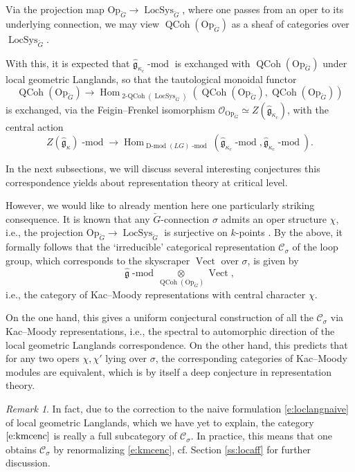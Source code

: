\documentclass[10pt]{amsart}
\newcommand{\fgk}{\widehat{\fg}_\kappa}
\newcommand{\Op}{\mathrm{Op}_{\cG}}
\newcommand{\gkc}{\gk_{\kappa_c}}
\newcommand{\TwoCoh}{\on{2-QCoh}}
\newcommand{\LS}{\on{LocSys}_{\cG}}
\newcommand{\fg}{\mathfrak{g}}
\newcommand{\on}{\operatorname}
\renewcommand{\mod}{\on{-mod}}
\newcommand{\Dmod}{\on{D-mod}}
\newcommand{\Vect}{\on{Vect}}
\theoremstyle{remark}
\newtheorem{re}[subsubsection]{Remark}
\newcommand{\Hom}{\operatorname{Hom}}
\newcommand{\OO}{\mathscr{O}}
\newcommand{\gk}{\widehat{\fg}}
\numberwithin{equation}{section}
\newcommand{\cG}{\check{G}}
\newcommand{\sC}{\mathscr{C}}
\renewcommand{\mod}{\operatorname{-mod}}
\newcommand{\QCoh}{\on{QCoh}}
\begin{document}
\subsubsection{} Via the projection map $\Op \rightarrow \LS$, where one 
passes from an oper 
to its underlying connection, we may view $\QCoh(\Op)$ as a sheaf of categories 
over $\LS$. 


With this, it is expected that $\gkc\mod$ is exchanged with 
$\QCoh(\Op)$ under local geometric Langlands, so that the tautological monoidal 
functor
%
\[
\QCoh(\Op) \rightarrow \Hom_{\TwoCoh(\LS)}(\QCoh(\Op), \QCoh(\Op)) 
\]
%
is exchanged, via the Feigin--Frenkel isomorphism $\OO_{\Op} \simeq Z(\gkc)$, 
with the central action 
%
\[
  Z(\fgk)\mod \rightarrow \Hom_{\Dmod(LG)\mod}(\gkc\mod, \gkc\mod).
  \]
%







 In the next subsections, we will 
discuss several interesting conjectures this correspondence yields about representation theory 
at critical level. 

However, we would like to already mention here one particularly striking consequence. 
It is known that any $\cG$-connection $\sigma$ admits an oper structure $\chi$, 
i.e., the projection $\Op \rightarrow \LS$ is surjective on $k$-points \cite{frenkelzhuoper}. By the 
above, it formally follows that the `irreducible' categorical representation 
$\sC_{\sigma}$ of the loop group, which corresponds to the skyscraper $\Vect$ 
over $\sigma$, is given by 
%
\begin{equation} \label{e:kmcenc}
  \gk\mod \underset{\QCoh(\Op)} \otimes \Vect,
\end{equation}
%
i.e., the category of Kac--Moody representations with central character $\chi$. 


On the one hand, this gives a uniform conjectural construction of all the 
$\sC_{\sigma}$ via Kac--Moody representations, i.e., the spectral to automorphic 
direction of the local geometric Langlands correspondence. On the other hand, this 
predicts that for any two opers $\chi, \chi'$ lying over $\sigma$, the 
corresponding 
categories of Kac--Moody modules are equivalent, which is by itself a deep 
conjecture in representation theory. 


\begin{re} In fact, due to the correction to the naive formulation 
\eqref{e:loclangnaive} of local geometric Langlands, which we 
have yet to explain, the category $\eqref{e:kmcenc}$ is really a full subcategory of 
$\sC_{\sigma}$. In practice, this means that 
one obtains $\sC_{\sigma}$ by 
renormalizing \eqref{e:kmcenc},  cf. Section \ref{ss:locaff} for 
further discussion. 
\end{re}
\end{document}
